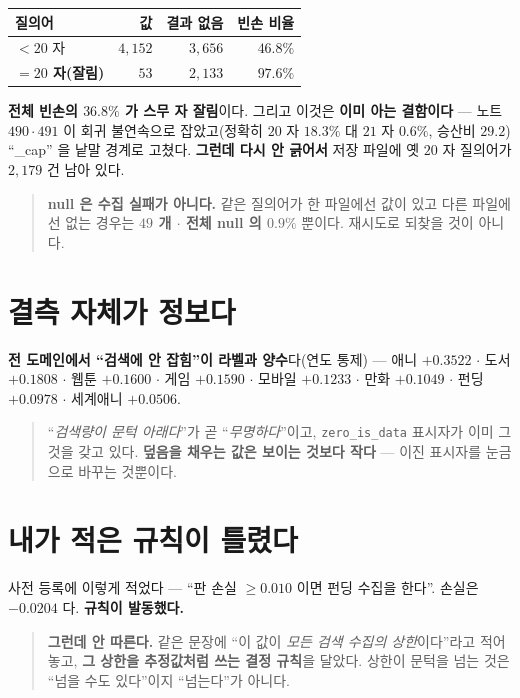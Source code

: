 \documentclass[11pt]{article}
\begin{document}
\begin{center}
\begin{tabular}{lrrr}
\hline
질의어 & 값 & 결과 없음 & \textbf{빈손 비율} \\
\hline
$<20$ 자 & $4{,}152$ & $3{,}656$ & $46.8\%$ \\
\textbf{$=20$ 자(잘림)} & $53$ & $2{,}133$ & $\mathbf{97.6\%}$ \\
\hline
\end{tabular}
\end{center}

\textbf{전체 빈손의 $36.8\%$ 가 스무 자 잘림}이다. 그리고 이것은
\textbf{이미 아는 결함이다} --- 노트 $490 \cdot 491$ 이 회귀 불연속으로
잡았고(정확히 $20$ 자 $18.3\%$ 대 $21$ 자 $0.6\%$, 승산비 $29.2$)
``\_cap'' 을 낱말 경계로 고쳤다. \textbf{그런데 다시 안 긁어서} 저장 파일에
옛 $20$ 자 질의어가 $2{,}179$ 건 남아 있다.

\begin{quote}
\textbf{null 은 수집 실패가 아니다.} 같은 질의어가 한 파일에선 값이 있고
다른 파일에선 없는 경우는 \textbf{$49$ 개 $\cdot$ 전체 null 의 $0.9\%$}
뿐이다. 재시도로 되찾을 것이 아니다.
\end{quote}

\section{결측 자체가 정보다}

\textbf{전 도메인에서 ``검색에 안 잡힘''이 라벨과 양수}다(연도 통제) ---
애니 $+0.3522$ $\cdot$ 도서 $+0.1808$ $\cdot$ 웹툰 $+0.1600$ $\cdot$ 게임
$+0.1590$ $\cdot$ 모바일 $+0.1233$ $\cdot$ 만화 $+0.1049$ $\cdot$ 펀딩
$+0.0978$ $\cdot$ 세계애니 $+0.0506$.

\begin{quote}
``\emph{검색량이 문턱 아래다}''가 곧 ``\emph{무명하다}''이고,
\texttt{zero\_is\_data} 표시자가 이미 그것을 갖고 있다. \textbf{덮음을
채우는 값은 보이는 것보다 작다} --- 이진 표시자를 눈금으로 바꾸는 것뿐이다.
\end{quote}

\section{내가 적은 규칙이 틀렸다}

사전 등록에 이렇게 적었다 --- ``판 손실 $\ge 0.010$ 이면 펀딩 수집을
한다''. 손실은 $\mathbf{-0.0204}$ 다. \textbf{규칙이 발동했다.}

\begin{quote}
\textbf{그런데 안 따른다.} 같은 문장에 ``이 값이 \emph{모든 검색 수집의
상한}이다''라고 적어 놓고, \textbf{그 상한을 추정값처럼 쓰는 결정 규칙}을
달았다. 상한이 문턱을 넘는 것은 ``넘을 수도 있다''이지 ``넘는다''가 아니다.
\end{quote}
\end{document}
